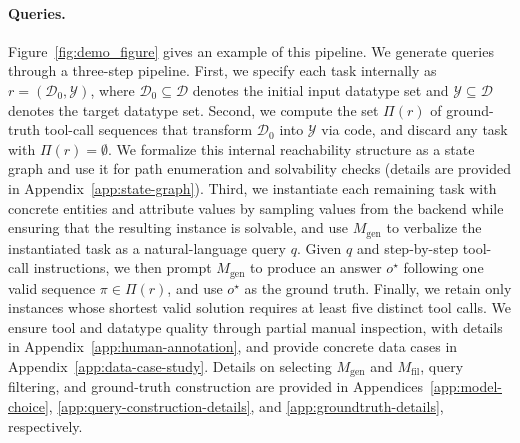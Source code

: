 \paragraph{Queries.}
Figure~\ref{fig:demo_figure} gives an example of this pipeline.
We generate queries through a three-step pipeline.
First, we specify each task internally as $r=(\mathcal{D}_0, \mathcal{Y})$, where $\mathcal{D}_0 \subseteq \mathcal{D}$ denotes the initial input datatype set and $\mathcal{Y} \subseteq \mathcal{D}$ denotes the target datatype set.
Second, we compute the set $\Pi(r)$ of ground-truth tool-call sequences that transform $\mathcal{D}_0$ into $\mathcal{Y}$ via code, and discard any task with $\Pi(r)=\emptyset$.
We formalize this internal reachability structure as a state graph and use it for path enumeration and solvability checks (details are provided in Appendix~\ref{app:state-graph}).
Third, we instantiate each remaining task with concrete entities and attribute values by sampling values from the backend while ensuring that the resulting instance is solvable, and use $M_{\mathrm{gen}}$ to verbalize the instantiated task as a natural-language query $q$.
Given $q$ and step-by-step tool-call instructions, we then prompt $M_{\mathrm{gen}}$ to produce an answer $o^\star$ following one valid sequence $\pi \in \Pi(r)$, and use $o^\star$ as the ground truth.
Finally, we retain only instances whose shortest valid solution requires at least five distinct tool calls.
We ensure tool and datatype quality through partial manual inspection, with details in Appendix~\ref{app:human-annotation}, and provide concrete data cases in Appendix~\ref{app:data-case-study}.
Details on selecting $M_{\mathrm{gen}}$ and $M_{\mathrm{fil}}$, query filtering, and ground-truth construction are provided in Appendices~\ref{app:model-choice}, \ref{app:query-construction-details}, and \ref{app:groundtruth-details}, respectively.





